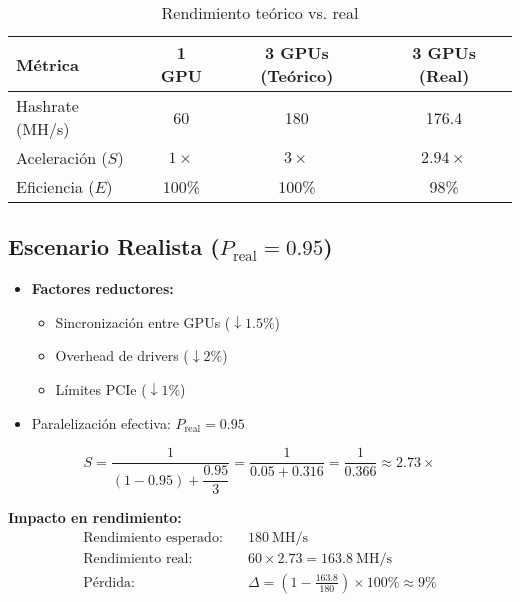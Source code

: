 \documentclass{article}
\begin{document}
\begin{table}[h]
\centering
\caption{Rendimiento teórico vs. real}
\begin{tabular}{lccc}
\toprule
Métrica & 1 GPU & 3 GPUs (Teórico) & 3 GPUs (Real) \\
\midrule
Hashrate (MH/s) & 60 & 180 & 176.4 \\
Aceleración (\(S\)) & \(1\times\) & \(3\times\) & \(2.94\times\) \\
Eficiencia (\(E\)) & 100\% & 100\% & 98\% \\
\bottomrule
\end{tabular}
\end{table}

\subsection*{Escenario Realista (\(P_{\text{real}} = 0.95\))}
\begin{itemize}
  \item \textbf{Factores reductores:}
  \begin{itemize}
    \item Sincronización entre GPUs (\(\downarrow 1.5\%\))
    \item Overhead de drivers (\(\downarrow 2\%\))
    \item Límites PCIe (\(\downarrow 1\%\))
  \end{itemize}
  \item Paralelización efectiva: \(P_{\text{real}} = 0.95\)
\end{itemize}
\[
S = \dfrac{1}{(1 - 0.95) + \dfrac{0.95}{3}} = \dfrac{1}{0.05 + 0.316} = \dfrac{1}{0.366} \approx 2.73\times
\]

\vspace{1em}
\noindent
\textbf{Impacto en rendimiento:}
\begin{align*}
\text{Rendimiento esperado:} \quad & 180\ \text{MH/s} \\
\text{Rendimiento real:} \quad & 60 \times 2.73 = 163.8\ \text{MH/s} \\
\text{Pérdida:} \quad & \Delta = \left(1 - \frac{163.8}{180}\right) \times 100\% \approx 9\%
\end{align*}
\end{document}
